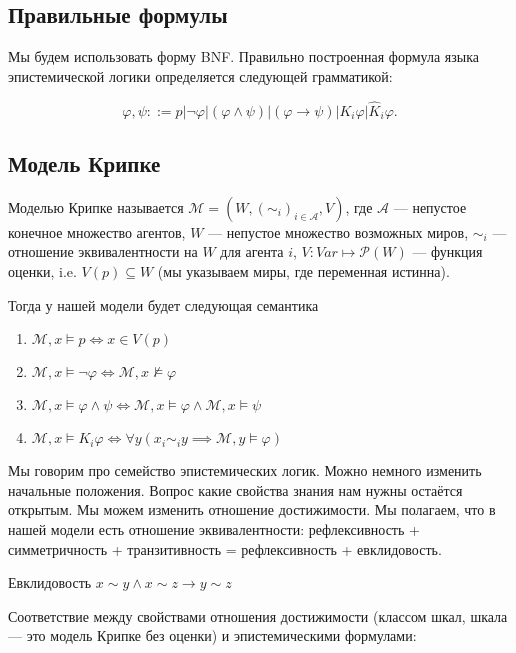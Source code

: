 \documentclass[openany]{book}
\theoremstyle{plain}
\theoremstyle{definition}
\begin{document}
\subsection{Правильные формулы}

Мы будем использовать форму BNF. Правильно построенная формула языка эпистемической логики определяется следующей грамматикой:

\[\varphi, \psi ::= p | \neg \varphi | (\varphi \land \psi) | (\varphi \to \psi) | K_i\varphi | \hat{K}_i \varphi.\]

\subsection{Модель Крипке}

Моделью Крипке называется \(\mathcal{M} = (W, (\sim_i)_{i\in \mathcal{A}}, V)\), где
\(\mathcal{A}\) — непустое конечное множество агентов, \(W\) — непустое множество возможных миров, \(\sim_i\) — отношение эквивалентности на \(W\) для агента \(i\), \(V : Var \mapsto \mathcal{P}(W)\) — функция оценки, i.e. \(V(p) \subseteq W\) (мы указываем миры, где переменная истинна).

Тогда у нашей модели будет следующая семантика
\begin{enumerate}
    \item\(\mathcal{M}, x \models p \Leftrightarrow x \in V(p)\) 
    \item\(\mathcal{M}, x \models \neg \varphi \Leftrightarrow \mathcal{M}, x \not\models \varphi\) 
    \item\(\mathcal{M}, x \models \varphi \land \psi \Leftrightarrow \mathcal{M}, x \models \varphi \land \mathcal{M}, x \models \psi\)
    \item\(\mathcal{M}, x \models K_i \varphi \Leftrightarrow \forall y(x_i \sim_i y \implies \mathcal{M}, y \models \varphi)\)
\end{enumerate}

Мы говорим про семейство эпистемических логик. Можно немного изменить начальные положения.
Вопрос какие свойства знания нам нужны остаётся открытым. Мы можем изменить отношение достижимости. Мы полагаем, что в нашей модели есть отношение эквивалентности: рефлексивность + симметричность + транзитивность = рефлексивность + евклидовость.

Евклидовость \(x \sim y \land x \sim z \to y \sim z\)

Соответствие между свойствами отношения достижимости (классом шкал, шкала — это модель Крипке без оценки) и эпистемическими формулами:
\end{document}
